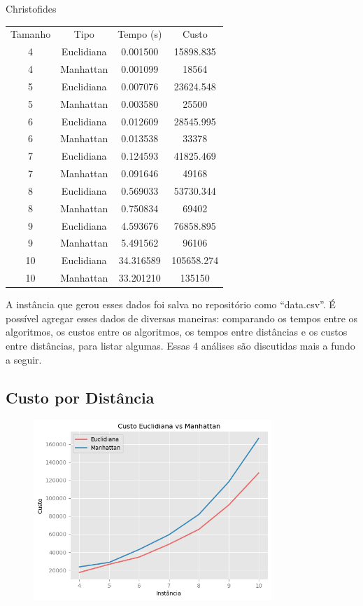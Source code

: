 \documentclass{article}
\begin{document}
\begin{center}
	Christofides \\ [1ex]
	\begin{tabular}{c c c c }
		\hline
		Tamanho & Tipo       & Tempo (s) & Custo      \\ [0.5ex]
		4       & Euclidiana & 0.001500  & 15898.835  \\
		4       & Manhattan  & 0.001099  & 18564      \\
		5       & Euclidiana & 0.007076  & 23624.548  \\
		5       & Manhattan  & 0.003580  & 25500      \\
		6       & Euclidiana & 0.012609  & 28545.995  \\
		6       & Manhattan  & 0.013538  & 33378      \\
		7       & Euclidiana & 0.124593  & 41825.469  \\
		7       & Manhattan  & 0.091646  & 49168      \\
		8       & Euclidiana & 0.569033  & 53730.344  \\
		8       & Manhattan  & 0.750834  & 69402      \\
		9       & Euclidiana & 4.593676  & 76858.895  \\
		9       & Manhattan  & 5.491562  & 96106      \\
		10      & Euclidiana & 34.316589 & 105658.274 \\
		10      & Manhattan  & 33.201210 & 135150     \\ [1ex]
		\hline
	\end{tabular}
\end{center}

A instância que gerou esses dados foi salva no repositório como ``data.csv''. É possível agregar esses dados de diversas maneiras: comparando os tempos entre os algoritmos, os custos entre os algoritmos, os tempos entre distâncias e os custos entre distâncias, para listar algumas. Essas 4 análises são discutidas mais a fundo a seguir.

\subsection{Custo por Distância}

\begin{figure} [H]
	\includegraphics[width=9cm]{met_vs}
	\centering
\end{figure}
\end{document}
